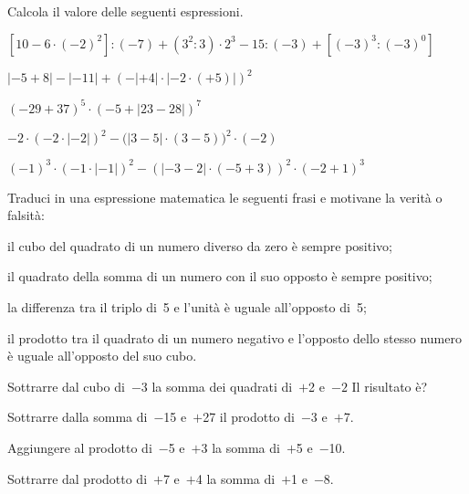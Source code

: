 \begin{esercizio}[\Ast]
Calcola il valore delle seguenti espressioni.
 \begin{enumeratea}
 \item \([10-6\cdot(-2)^2]:(-7)+(3^2:3)\cdot2^3-15:(-3)+[(-3)^3:(-3)^0]\)
 \item \(|-5+8|-|-11|+(-|+4|\cdot|-2\cdot(+5)|)^2\)
 \item \((-29+37)^5\cdot(-5+|23-28|)^7\)
 \item \(-2\cdot(-2\cdot|-2|)^2-\big(|3-5|\cdot(3-5)\big)^2\cdot(-2)\)
 \item \((-1)^3\cdot(-1\cdot|-1|)^2-(|-3-2|\cdot(-5+3))^2\cdot(-2+1)^3\)
 \end{enumeratea}
\end{esercizio}
\begin{multicols}{2}
\begin{esercizio}
Traduci in una espressione matematica le seguenti frasi e motivane la verità o 
falsità:
 \begin{enumeratea}
 \item il cubo del quadrato di un numero diverso da zero è sempre positivo;
 \item il quadrato della somma di un numero con il suo opposto è sempre 
positivo;
 \item la differenza tra il triplo di~5 e l'unità è uguale all'opposto di~5;
 \item il prodotto tra il quadrato di un numero negativo e l'opposto dello 
stesso numero 
è uguale all'opposto del suo cubo.
 \end{enumeratea}
\end{esercizio}

\begin{esercizio}
 Sottrarre dal cubo di~\(-3\) la somma dei quadrati di~\(+\)2 e~\(-2\) Il risultato è?
\end{esercizio}

\begin{esercizio}
 Sottrarre dalla somma di~\(-\)15 e~\(+\)27 il prodotto di~\(-\)3 e~\(+\)7.
\end{esercizio}

\begin{esercizio}
 Aggiungere al prodotto di~\(-\)5 e~\(+\)3 la somma di~\(+\)5 e~\(-\)10.
\end{esercizio}

\begin{esercizio}
 Sottrarre dal prodotto di~\(+\)7 e~\(+\)4 la somma di~\(+\)1 e~\(-\)8.
\end{esercizio}


\end{multicols}
